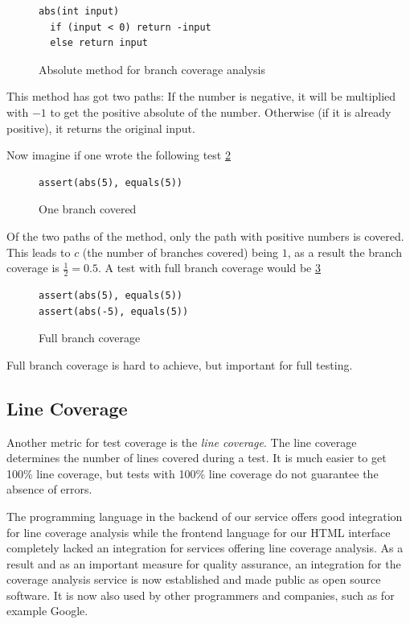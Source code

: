 \begin{figure}
\begin{lstlisting}
abs(int input)
  if (input < 0) return -input
  else return input
\end{lstlisting}
\caption{Absolute method for branch coverage analysis}
\label{code:branchCoverage}
\end{figure}

This method has got two paths: If the number is negative, it will
be multiplied with $-1$ to get the positive absolute of the number.
Otherwise (if it is already positive), it returns the original input.

Now imagine if one wrote the following test \ref{code:oneBranch}

\begin{figure}
\begin{lstlisting}
assert(abs(5), equals(5))
\end{lstlisting}
\caption{One branch covered}
\label{code:oneBranch}
\end{figure}

Of the two paths of the method, only the path with positive numbers is
covered. This leads to $c$ (the number of branches covered) being $1$,
as a result the branch coverage is $\frac{1}{2} = 0.5$. A test with
full branch coverage would be \ref{code:fullBranch}

\begin{figure}
\begin{lstlisting}
assert(abs(5), equals(5))
assert(abs(-5), equals(5))
\end{lstlisting}
\caption{Full branch coverage}
\label{code:fullBranch}
\end{figure}

Full branch coverage is hard to achieve, but important for full testing.

\subsection{Line Coverage}

Another metric for test coverage is the \textit{line coverage}. The line
coverage determines the number of lines covered during a test. It is much
easier to get 100\% line coverage, but tests with 100\% line coverage do
not guarantee the absence of errors.

The programming language in the backend of our service offers good integration
for line coverage analysis while the frontend language for our HTML interface
completely lacked an integration for services offering line coverage analysis.
As a result and as an important measure for quality assurance, an integration
for the coverage analysis service is now established and made public as open
source software. It is now also used by other programmers and companies, such
as for example Google.

